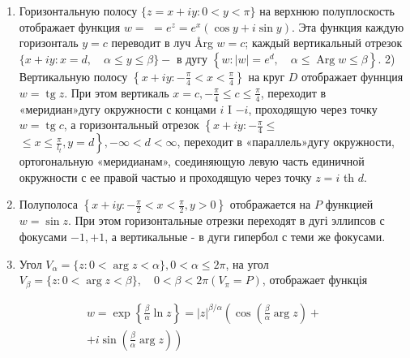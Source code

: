 \documentclass[10pt]{article}
\begin{document}
\begin{enumerate}

  \item Горизонтальную полосу $\{z=x+i y: 0<y<\pi\}$ на верхнюю полуплоскость отображает функция $w=$ $=e^{z}=e^{x}(\cos y+i \sin y)$. Эта функция каждую горизонталь $y=c$ переводит в луч Årg $w=c$; каждый вертикальный отрезок $\{x+i y: x=d, \quad \alpha \leqslant y \leqslant \beta\}-$ в дугу $\left\{w:|w|=e^{d}, \quad \alpha \leqslant \operatorname{Arg} w \leqslant \beta\right\}$. 2) Вертикальную полосу $\left\{x+i y:-\frac{\pi}{4}<x<\frac{\pi}{4}\right\}$ на круг $D$ отображает фуннция $w=\operatorname{tg} z$. При этом вертикаль $x=c,-\frac{\pi}{4} \leqslant c \leqslant \frac{\pi}{4}$, переходит в «меридиан»дугу окружности с концами $i$ I $-i$, проходящую через точку $w=\operatorname{tg} c$, а горизонтальный отрезок $\left\{x+i y:-\frac{\pi}{4} \leqslant\right.$ $\left.\leqslant x \leqslant \frac{\pi}{l_{t}}, y=d\right\},-\infty<d<\infty$, переходит в «параллель»дугу окружности, ортогональную «меридианам», соединяющую левую часть единичной окружности с ее правой частью и проходящую через точку $z=i$ th $d$.



  \item Полуполоса $\left\{x+i y:-\frac{\pi}{2}<x<\frac{\pi}{2}, y>0\right\}$ отображается на $P$ функцией $w=\sin z$. При этом горизонтальные отрезки переходят в дугі эллипсов с фокусами $-1,+1$, а вертикальные - в дуги гипербол с теми же фокусами.



  \item Угол $V_{\alpha}=\{z: 0<\arg z<\alpha\}, 0<\alpha \leqslant 2 \pi$, на угол $V_{\beta}=\{z: 0<\arg z<\beta\}, \quad 0<\beta<2 \pi\left(V_{\pi}=P\right)$, отображает функція



\end{enumerate}



\[

\begin{gathered}

w=\exp \left\{\frac{\beta}{\alpha} \ln z\right\}=|z|^{\beta / \alpha}\left(\cos \left(\frac{\beta}{\alpha} \arg z\right)+\right. \\

\left.+i \sin \left(\frac{\beta}{\alpha} \arg z\right)\right)

\end{gathered}

\]
\end{document}
